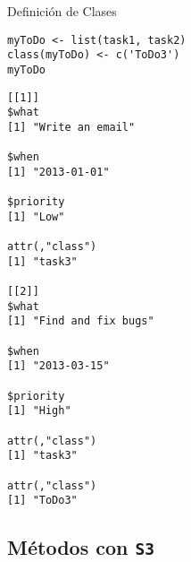\documentclass[xcolor={usenames,svgnames,dvipsnames}]{beamer}
\begin{document}
\begin{frame}[fragile,label=sec-2-1-4]{Definición de Clases}
 \lstset{language=R,numbers=none}
\begin{lstlisting}
myToDo <- list(task1, task2)
class(myToDo) <- c('ToDo3')
myToDo
\end{lstlisting}

\begin{verbatim}
[[1]]
$what
[1] "Write an email"

$when
[1] "2013-01-01"

$priority
[1] "Low"

attr(,"class")
[1] "task3"

[[2]]
$what
[1] "Find and fix bugs"

$when
[1] "2013-03-15"

$priority
[1] "High"

attr(,"class")
[1] "task3"

attr(,"class")
[1] "ToDo3"
\end{verbatim}
\end{frame}
\subsection{Métodos con \texttt{S3}}
\label{sec-2-2}
\end{document}
